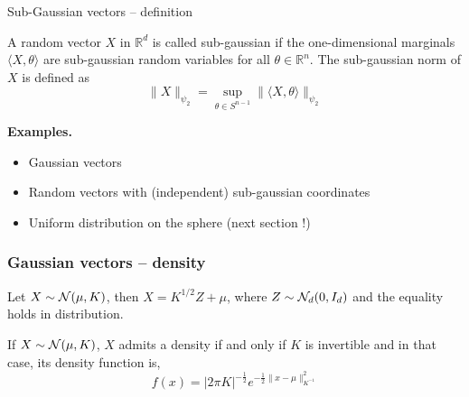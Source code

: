 \documentclass[handout]{beamer} %
\begin{document}
  \begin{frame}{Sub-Gaussian vectors -- definition}
    \begin{definition} A random vector $X$ in
      $\mathbb{R}^{d}$ is called sub-gaussian if the one-dimensional marginals
      $\langle X, \theta \rangle$ are sub-gaussian random variables for all $\theta \in \mathbb{R}^{n} .$ The sub-gaussian norm of $X$ is defined as
      $$
      \|X\|_{\psi_{2}}=\sup _{\theta \in S^{n-1}}\|\langle X, \theta\rangle\|_{\psi_{2}}
      $$

    \end{definition}

    \pause

    \textbf{Examples.}
    
    \begin{itemize}
    \item Gaussian vectors
    \item Random vectors with (independent) sub-gaussian coordinates
    \item Uniform distribution on the sphere (next section !)
    \end{itemize}
  \end{frame}

  \begin{frame}
    \frametitle{Gaussian vectors -- density}

    \begin{proposition}
      Let $X \sim \mathcal{N}(\mu,K)$, then $X =
      K^{1/2}Z + \mu$, where $Z \sim \mathcal{N}_d(0,I_d)$ and the equality holds in
      distribution. 
    \end{proposition}

    \pause

    \begin{corollary}
      
      If $X \sim \mathcal{N}(\mu,K)$, $X$ admits a density if and only if $K$ is
      invertible and in that case, its density function is,
      $$f(x)=|2 \pi K|^{-\frac{1}{2}} e^{-\frac{1}{2}\|x - \mu\|_{K^{-1}}^{2}}$$
    \end{corollary}
  \end{frame}
\end{document}
